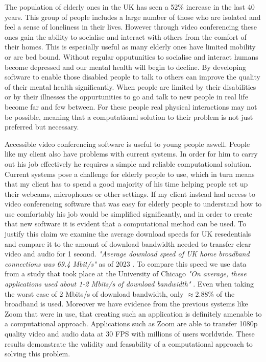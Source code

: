 The population of elderly ones in the UK has seen a 52\% 
increase in the last 40 years. This group of people includes
a large number of those who are isolated and feel a sense of 
loneliness in their lives. However through video conferencing
these ones gain the ability to socialise and interact with 
others from the comfort of their homes. This is especially 
useful as many elderly ones have limited mobility or are bed 
bound. Without regular opputunities to socialise and interact 
humans become depressed and our mental health will begin to 
decline. By developing software to enable those disabled 
people to talk to others can improve the quality of their 
mental health significantly. When people are limited by their 
disabilities or by their illnesses the oppurtunities to go and
talk to new people in real life become far and few between. For
these people real physical interactions may not be possible,
meaning that a computational solution to their problem is not
just preferred but necessary. \vspace{0.2cm}

Accessible video conferencing software is useful to young 
people aswell. People like my client also have problems with 
current systems. In order for him to carry out his job 
effectively he requires a simple and reliable computational
solution. Current systems pose a challenge for elderly people 
to use, which in turn means that my client has to spend a good
majority of his time helping people set up their webcams,
microphones or other settings. If my client instead had access
to video conferencing software that was easy for elderly people
to understand how to use comfortably his job would be 
simplified significantly, and in order to create that new 
software it is evident that a computational method can be 
used. To justify this claim we examine the average download
speeds for UK resedentials and compare it to the amount of 
download bandwidth needed to transfer clear video and audio 
for 1 second. \textit{"Average download speed of UK home 
broadband connections was 69.4 Mbit/s"} as of 2023 \cite{data}.
To compare this speed we use data from a study that took place
at the University of Chicago \textit{"On average, these
applications used about 1-2 Mbits/s of download bandwidth"}
\cite{chicago}. Even when taking the worst case of 2 Mbits/s
of download bandwidth, only $\approx 2.88\%$ of the broadband
is used. Moreover we have evidence from the previous systems 
like Zoom that were in use, that creating such an application
is definitely amenable to a computational approach.
Applications such as Zoom are able to transfer 1080p quality
video and audio data at 30 FPS with millions of users 
worldwide. These results demonstrate the validity and
feasability of a computational approach to solving this
problem. \\ \vspace{0.2cm}

